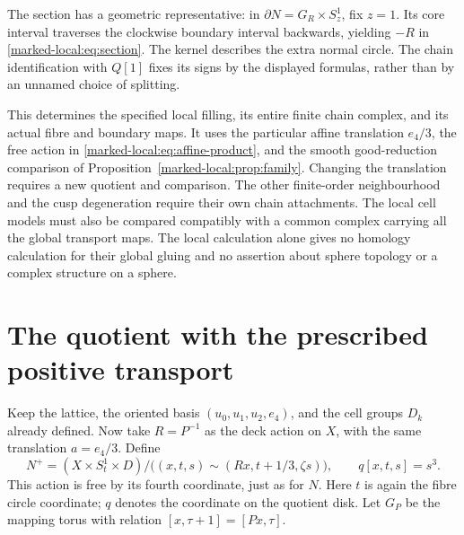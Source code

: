 The section has a geometric representative: in
$\partial N=G_R\times S^1_z$, fix $z=1$. Its core interval
traverses the clockwise boundary interval backwards, yielding
$-R$ in \eqref{marked-local:eq:section}. The kernel describes the extra normal
circle. The chain identification with $Q[1]$ fixes its signs by the
displayed formulas, rather than by an unnamed choice of splitting.

This determines the specified local filling, its entire finite chain
complex, and its actual fibre and boundary maps. It uses the particular affine
translation $e_4/3$, the free action in \eqref{marked-local:eq:affine-product},
and the smooth good-reduction comparison of
Proposition~\ref{marked-local:prop:family}. Changing the translation requires a
new quotient and comparison. The other finite-order neighbourhood and
the cusp degeneration require their own chain attachments. The local
cell models must also be compared compatibly with a common complex
carrying all the global transport maps. The local
calculation alone gives no homology calculation for their global gluing
and no assertion about sphere topology or a complex structure on a sphere.
\section{The quotient with the prescribed positive transport}

Keep the lattice, the oriented basis $(u_0,u_1,u_2,e_4)$, and the
cell groups $D_k$ already defined. Now take $R=P^{-1}$ as the deck
action on $X$, with the same translation $a=e_4/3$. Define
\begin{equation}\label{marked-local:eq:positive-quotient}
 N^+=(X\times S^1_t\times D)/
 \bigl((x,t,s)\sim(Rx,t+1/3,\zeta s)\bigr),
 \qquad q[x,t,s]=s^3.
\end{equation}
This action is free by its fourth coordinate, just as for $N$.
Here $t$ is again the fibre circle coordinate; $q$ denotes the
coordinate on the quotient disk. Let $G_P$ be the mapping torus
with relation $[x,\tau+1]=[Px,\tau]$.

